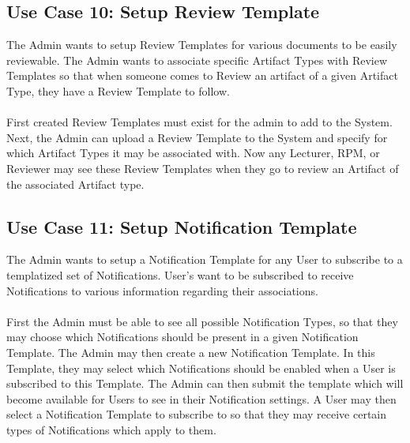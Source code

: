     
    
    \subsection*{Use Case 10: Setup Review Template  }
    The Admin wants to setup Review Templates for various documents to be easily reviewable. The Admin wants to associate specific Artifact Types with Review Templates so that when someone comes to Review an artifact of a given Artifact Type, they have a Review Template to follow.
    \\
    \\
    First created Review Templates must exist for the admin to add to the System. Next, the Admin can upload a Review Template to the System and specify for which Artifact Types it may be associated with. Now any Lecturer, RPM, or Reviewer may see these Review Templates when they go to review an Artifact of the associated Artifact type.
    
    
    
    
    
    
    
    
    
    
    \subsection*{Use Case 11: Setup Notification Template  }
    The Admin wants to setup a Notification Template for any User to subscribe to a templatized set of Notifications. User’s want to be subscribed to receive Notifications to various information regarding their associations.
    \\
    \\
    First the Admin must be able to see all possible Notification Types, so that they may choose which Notifications should be present in a given Notification Template. The Admin may then create a new Notification Template. In this Template, they may select which Notifications should be enabled when a User is subscribed to this Template. The Admin can then submit the template which will become available for Users to see in their Notification settings. A User may then select a Notification Template to subscribe to so that they may receive certain types of Notifications which apply to them.
    
    
    
    
    
    
    
    
    
